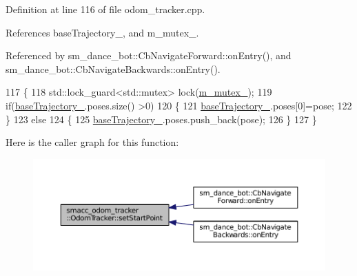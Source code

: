 Definition at line 116 of file odom\+\_\+tracker.\+cpp.



References base\+Trajectory\+\_\+, and m\+\_\+mutex\+\_\+.



Referenced by sm\+\_\+dance\+\_\+bot\+::\+Cb\+Navigate\+Forward\+::on\+Entry(), and sm\+\_\+dance\+\_\+bot\+::\+Cb\+Navigate\+Backwards\+::on\+Entry().


\begin{DoxyCode}
117 \{
118     std::lock\_guard<std::mutex> lock(\hyperlink{classsmacc__odom__tracker_1_1OdomTracker_ad65e52bfd236e073940808c35f2bed8c}{m\_mutex\_});
119     \textcolor{keywordflow}{if}(\hyperlink{classsmacc__odom__tracker_1_1OdomTracker_ac3a17be46ab833632c5f63e75c840dc7}{baseTrajectory\_}.poses.size() >0)
120     \{
121         \hyperlink{classsmacc__odom__tracker_1_1OdomTracker_ac3a17be46ab833632c5f63e75c840dc7}{baseTrajectory\_}.poses[0]=pose;
122     \}
123     \textcolor{keywordflow}{else}
124     \{
125         \hyperlink{classsmacc__odom__tracker_1_1OdomTracker_ac3a17be46ab833632c5f63e75c840dc7}{baseTrajectory\_}.poses.push\_back(pose);
126     \}
127 \}
\end{DoxyCode}


Here is the caller graph for this function\+:
\nopagebreak
\begin{figure}[H]
\begin{center}
\leavevmode
\includegraphics[width=350pt]{classsmacc__odom__tracker_1_1OdomTracker_a5ac7c4770b3e29b74571ef65377048ee_icgraph}
\end{center}
\end{figure}


